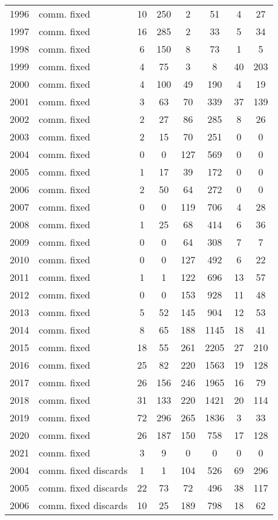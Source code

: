 \begin{longtable}[t]{c>{\centering\arraybackslash}p{3cm}cccccc}
1996 & comm. fixed & 10 & 250 & 2 & 51 & 4 & 27\\
1997 & comm. fixed & 16 & 285 & 2 & 33 & 5 & 34\\
1998 & comm. fixed & 6 & 150 & 8 & 73 & 1 & 5\\
1999 & comm. fixed & 4 & 75 & 3 & 8 & 40 & 203\\
2000 & comm. fixed & 4 & 100 & 49 & 190 & 4 & 19\\
2001 & comm. fixed & 3 & 63 & 70 & 339 & 37 & 139\\
2002 & comm. fixed & 2 & 27 & 86 & 285 & 8 & 26\\
2003 & comm. fixed & 2 & 15 & 70 & 251 & 0 & 0\\
2004 & comm. fixed & 0 & 0 & 127 & 569 & 0 & 0\\
2005 & comm. fixed & 1 & 17 & 39 & 172 & 0 & 0\\
2006 & comm. fixed & 2 & 50 & 64 & 272 & 0 & 0\\
2007 & comm. fixed & 0 & 0 & 119 & 706 & 4 & 28\\
2008 & comm. fixed & 1 & 25 & 68 & 414 & 6 & 36\\
2009 & comm. fixed & 0 & 0 & 64 & 308 & 7 & 7\\
2010 & comm. fixed & 0 & 0 & 127 & 492 & 6 & 22\\
2011 & comm. fixed & 1 & 1 & 122 & 696 & 13 & 57\\
2012 & comm. fixed & 0 & 0 & 153 & 928 & 11 & 48\\
2013 & comm. fixed & 5 & 52 & 145 & 904 & 12 & 53\\
2014 & comm. fixed & 8 & 65 & 188 & 1145 & 18 & 41\\
2015 & comm. fixed & 18 & 55 & 261 & 2205 & 27 & 210\\
2016 & comm. fixed & 25 & 82 & 220 & 1563 & 19 & 128\\
2017 & comm. fixed & 26 & 156 & 246 & 1965 & 16 & 79\\
2018 & comm. fixed & 31 & 133 & 220 & 1421 & 20 & 114\\
2019 & comm. fixed & 72 & 296 & 265 & 1836 & 3 & 33\\
2020 & comm. fixed & 26 & 187 & 150 & 758 & 17 & 128\\
2021 & comm. fixed & 3 & 9 & 0 & 0 & 0 & 0\\
2004 & comm. fixed discards & 1 & 1 & 104 & 526 & 69 & 296\\
2005 & comm. fixed discards & 22 & 73 & 72 & 496 & 38 & 117\\
2006 & comm. fixed discards & 10 & 25 & 189 & 798 & 18 & 62\\

\end{longtable}
